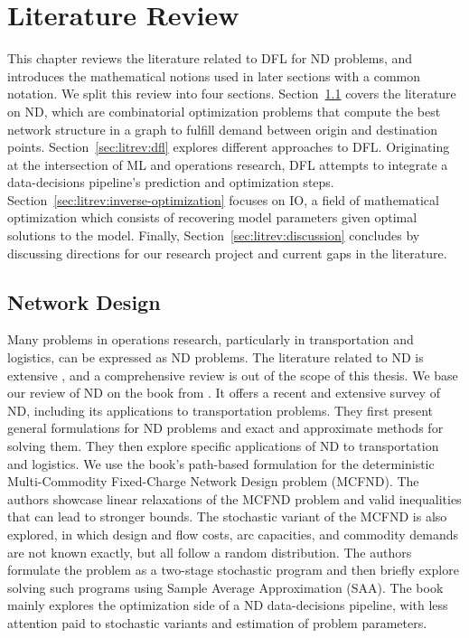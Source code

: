 \chapter{Literature Review} \label{sec:litrev}

This chapter reviews the literature related to DFL for ND problems, and introduces the mathematical notions used in later sections with a common notation. We split this review into four sections. Section~\ref{sec:litrev:network-design} covers the literature on ND, which are combinatorial optimization problems that compute the best network structure in a graph to fulfill demand between origin and destination points. Section~\ref{sec:litrev:dfl} explores different approaches to DFL. Originating at the intersection of ML and operations research, DFL attempts to integrate a data-decisions pipeline's prediction and optimization steps. Section~\ref{sec:litrev:inverse-optimization} focuses on IO, a field of mathematical optimization which consists of recovering model parameters given optimal solutions to the model. Finally, Section~\ref{sec:litrev:discussion} concludes by discussing directions for our research project and current gaps in the literature.

\section{Network Design} \label{sec:litrev:network-design}

Many problems in operations research, particularly in transportation and logistics, can be expressed as ND problems. The literature related to ND is extensive \citep{hirschFixedChargeProblem1968, gomoryMultiTerminalNetworkFlows1961, gendronMulticommodityCapacitatedNetwork1999a, cadarsoStrategicMultistageOperational2018}, and a comprehensive review is out of the scope of this thesis. We base our review of ND on the book from \cite{crainicNetworkDesignApplications2021}. It offers a recent and extensive survey of ND, including its applications to transportation problems. They first present general formulations for ND problems and exact and approximate methods for solving them. They then explore specific applications of ND to transportation and logistics. We use the book's path-based formulation for the deterministic Multi-Commodity Fixed-Charge Network Design problem (MCFND). The authors showcase linear relaxations of the MCFND problem and valid inequalities that can lead to stronger bounds. The stochastic variant of the MCFND is also explored, in which design and flow costs, arc capacities, and commodity demands are not known exactly, but all follow a random distribution. The authors formulate the problem as a two-stage stochastic program and then briefly explore solving such programs using Sample Average Approximation (SAA). The book mainly explores the optimization side of a ND data-decisions pipeline, with less attention paid to stochastic variants and estimation of problem parameters. 

